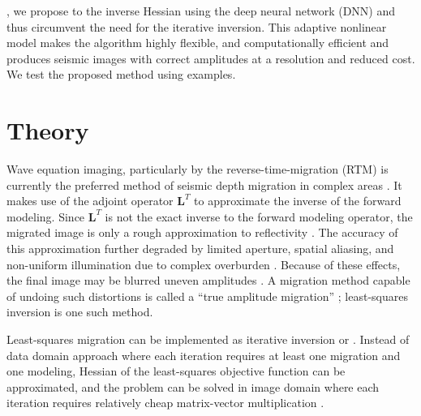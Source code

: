, we propose to  the inverse Hessian using the deep neural network (DNN) and thus circumvent the need for the iterative inversion. This adaptive nonlinear model makes the algorithm highly flexible, and computationally efficient and produces seismic images with correct amplitudes at a resolution and reduced cost. We test the proposed method using examples.     


\section{Theory}
\hspace{\parindent} Wave equation imaging, particularly by the reverse-time-migration (RTM) is currently the preferred method of seismic depth migration in complex areas \cite[]{liu2011effective}. It makes use of the adjoint operator $\mathbf L^T$ to approximate the inverse of the forward modeling. Since $\mathbf L^T$ is not the exact inverse to the forward modeling operator, the migrated image is only a rough approximation to reflectivity \cite[]{hu2001poststack}. The accuracy of this approximation  further degraded by limited aperture, spatial aliasing, and non-uniform illumination due to complex overburden \cite[]{claerbout1992earth,wang2016least}. Because of these effects, the final image may be blurred  uneven amplitudes \cite[]{gray1997true,guitton2004amplitude}. A migration method capable of undoing such distortions is called a ``true amplitude migration'' \cite[]{gray1997true}; least-squares inversion is one such method.

Least-squares migration can be implemented as  iterative inversion  \cite[]{nemeth1999least,wang2016least} or \cite[]{hu2001poststack,rickett2003illumination,guitton2004amplitude,wang2016least}. Instead of data domain approach where each iteration requires at least one migration and one modeling, Hessian of the least-squares objective function can be approximated, and the problem can be solved in image domain where each iteration requires relatively cheap matrix-vector multiplication . 


